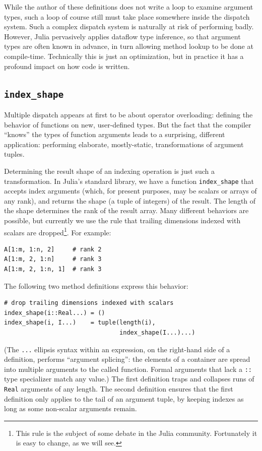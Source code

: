 \documentclass[preprint]{sigplanconf}
\newcommand{\code}[1]{\texttt{#1}}
\begin{document}
While the author of these definitions does not write a loop to examine
argument types, such a loop of course still must take place somewhere inside
the dispatch system. Such a complex dispatch system is naturally at risk of
performing badly. However, Julia pervasively applies dataflow type
inference, so that argument types are often known in advance, in turn
allowing method lookup to be done at compile-time. Technically this is
just an optimization, but in practice it has a profound impact on how code
is written.

\subsection{\code{index\_shape}}

Multiple dispatch appears at first to be about operator overloading:
defining the behavior of functions on new, user-defined types.
But the fact that the compiler ``knows'' the types of function arguments leads
to a surprising, different application: performing elaborate, mostly-static,
transformations of argument tuples.

Determining the result shape of an indexing operation is just such a
transformation. In Julia's standard library, we have a function
\code{index\_shape} that accepts index arguments (which, for present
purposes, may be scalars or arrays of any rank), and returns the
shape (a tuple of integers) of the result. The length of the shape
determines the rank of the result array. Many different behaviors
are possible, but currently we use the rule that trailing dimensions
indexed with scalars are dropped\footnote{This rule is the subject of
some debate in the Julia community. Fortunately it is easy to change,
as we will see.}.
For example:

\begin{verbatim}
A[1:m, 1:n, 2]     # rank 2
A[1:m, 2, 1:n]     # rank 3
A[1:m, 2, 1:n, 1]  # rank 3
\end{verbatim}

The following two method definitions express this behavior:

{\small
\begin{verbatim}
# drop trailing dimensions indexed with scalars
index_shape(i::Real...) = ()
index_shape(i, I...)    = tuple(length(i),
                                index_shape(I...)...)
\end{verbatim}
}
(The \code{...} ellipsis syntax within an expression, on the right-hand side of
a definition, performs ``argument splicing'': the elements of a container
are spread into multiple arguments to the called function. Formal
arguments that lack a \code{::} type specializer match any value.)
The first definition traps and collapses runs of \code{Real} arguments of
any length. The second definition ensures that the first definition only
applies to the tail of an argument tuple, by keeping indexes as long as
some non-scalar arguments remain.
\end{document}
